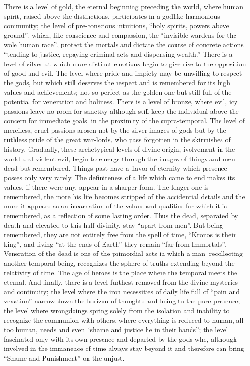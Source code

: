 There is a level of gold, the eternal beginning preceding the world, 
where human spirit, raised above the distinctions,
participates in a godlike harmonious community;
the level of pre-conscious intuitions, ``holy spirits, powers above ground'',
which, like conscience and compassion, the ``invisible wardens for the wole human race'',
protect the mortals and dictate the course of concrete actions 
``tending to justice, repaying criminal acts and dispensing wealth.''
There is a level of silver at which more distinct emotions begin to give rise to the 
opposition of good and evil. The level where pride and impiety may be unwilling to respect
the gods, but which still deserves the respect and is remembered for its high values and
 achievements; not so perfect as the golden one but still full of the potential for 
veneration and holiness.
There is a level of bronze, where evil, icy passions leave no room for sanctity although
still keep the individual above the concern for immediate goals, in the proximity of 
the supra-temporal. The level of merciless, cruel passions arosen not by the silver 
images of gods but by the ruthless pride of the great war-lords, who pass 
forgotten in the skirmishes of history. 
Gradually, these archetypical levels of divine origin, ivolvement in the world and
violent evil, begin to emerge through the images of things and men dead but remembered.
Things past have a flavor of eternity which presence posses only very rarely. The definiteness
of a life which came to end makes its values, if there were any, appear in a sharper form.
The longer one is remembered, the more his life becomes stripped of the accidential details and
the more it appears as an incarnation of the values and qualities for which it is remembered, as 
a reflection of some lasting order. Thus the dead, separated by death and elevated to
this half-divinity, stay ``apart from men''. 
But being remembered, they are not entirely free from the spell of time, 
``Kronos is their king'', and living ``at the ends of Earth'' they remain ``far from Immortals''.
Veneration of the dead is one of the primordial acts in which a man, recollecting another
temporal being, recognizes the sphere of truths extending beyond the relativity of time.
The age of heroes is the place where the temporal meets the eternal.
And finally, there is a level furthest removed from the divine mysteries and continuity;
the level where the iron necessities of daily life full of ``pain and vexation'' narrow down
the horizon of thoughts and being to the pure presence; the level where wrongdoings spring 
solely from the isolation and inability to recognize the communion with others, where 
everything is reduced to human, all too human, needs and even ``shame and justice lie
in their hands''; the level fascinated only with its own presence and  departed by
the gods who, although involved in the immanence of time always stay beyond it and therefore 
can bring ``Shame and Punishment'' on the unjust.

